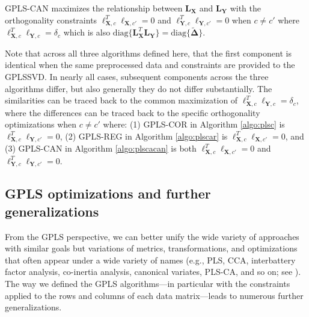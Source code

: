 \documentclass[12pt]{article}
\begin{document}
GPLS-CAN maximizes the relationship between \({\mathbf L}_{\mathbf X}\)
and \({\mathbf L}_{\mathbf Y}\) with the orthogonality constraints
\({\boldsymbol \ell}_{{\mathbf X},c}^{T}{\boldsymbol \ell}_{{\mathbf X},c'} = 0\)
and
\({\boldsymbol \ell}_{{\mathbf Y},c}^{T}{\boldsymbol \ell}_{{\mathbf Y},c'} = 0\)
when \(c \neq c'\) where
\({\boldsymbol \ell}_{{\mathbf X},c}^{T}{\boldsymbol \ell}_{{\mathbf Y},c} = \delta_{c}\)
which is also
\(\mathrm{diag\{}{\mathbf L}_{\mathbf X}^{T}{\mathbf L}_{\mathbf Y}\mathrm{\}} = \mathrm{diag\{}\widetilde{\boldsymbol \Delta}\mathrm{\}}\).

Note that across all three algorithms defined here, that the first
component is identical when the same preprocessed data and constraints
are provided to the GPLSSVD. In nearly all cases, subsequent components
across the three algorithms differ, but also generally they do not
differ substantially. The similarities can be traced back to the common
maximization of
\({\boldsymbol \ell}_{{\mathbf X},c}^{T}{\boldsymbol \ell}_{{\mathbf Y},c} = \delta_{c}\),
where the differences can be traced back to the specific orthogonality
optimizations when \(c \neq c'\) where: (1) GPLS-COR in Algorithm
\ref{algo:plsc} is
\({\boldsymbol \ell}_{{\mathbf X},c}^{T}{\boldsymbol \ell}_{{\mathbf Y},c'} = 0\),
(2) GPLS-REG in Algorithm \ref{algo:plscar} is
\({\boldsymbol \ell}_{{\mathbf X},c}^{T}{\boldsymbol \ell}_{{\mathbf X},c'} = 0\),
and (3) GPLS-CAN in Algorithm \ref{algo:plscacan} is both
\({\boldsymbol \ell}_{{\mathbf X},c}^{T}{\boldsymbol \ell}_{{\mathbf X},c'} = 0\)
and
\({\boldsymbol \ell}_{{\mathbf Y},c}^{T}{\boldsymbol \ell}_{{\mathbf Y},c'} = 0\).

\hypertarget{gpls-optimizations-and-further-generalizations}{%
\subsection{GPLS optimizations and further
generalizations}\label{gpls-optimizations-and-further-generalizations}}

From the GPLS perspective, we can better unify the wide variety of
approaches with similar goals but variations of metrics,
transformations, and optimizations that often appear under a wide
variety of names (e.g., PLS, CCA, interbattery factor analysis,
co-inertia analysis, canonical variates, PLS-CA, and so on; see
\citet{abdi2017canonical}). The way we defined the GPLS algorithms---in
particular with the constraints applied to the rows and columns of each
data matrix---leads to numerous further generalizations.
\end{document}
